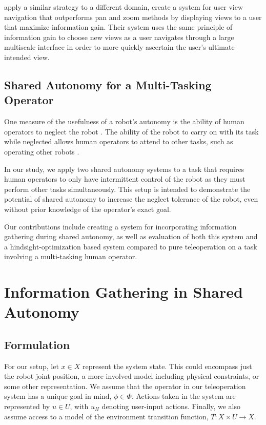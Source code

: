 \documentclass[conference]{IEEEtran}
\begin{document}
\citet{liu2017bignav} apply a similar strategy to a different domain, create a system for user view navigation that outperforms pan and zoom methods by displaying views to a user that maximize information gain. Their system uses the same principle of information gain to choose new views as a user navigates through a large multiscale interface in order to more quickly ascertain the user's ultimate intended view.

\subsection{Shared Autonomy for a Multi-Tasking Operator}
One measure of the usefulness of a robot's autonomy is the ability of human operators to neglect the robot \cite{crandall2002characterizing, olsen2003metrics}. The ability of the robot to carry on with its task while neglected allows human operators to attend to other tasks, such as operating other robots \cite{crandall2005validating, cummings2008predicting}.

In our study, we apply two shared autonomy systems to a task that requires human operators to only have intermittent control of the robot as they must perform other tasks simultaneously. This setup is intended to demonstrate the potential of shared autonomy to increase the neglect tolerance of the robot, even without prior knowledge of the operator's exact goal.

Our contributions include creating a system for incorporating information gathering during shared autonomy, as well as evaluation of both this system and a hindsight-optimization based system compared to pure teleoperation on a task involving a multi-tasking human operator.

\section{Information Gathering in Shared Autonomy}
\subsection{Formulation}

For our setup, let $ x \in X $ represent the system state. This could encompass just the robot joint position, a more involved model including physical constraints, or some other representation. We assume that the operator in our teleoperation system has a unique goal in mind, $\phi \in \Phi$. Actions taken in the system are represented by $ u \in U $, with $u_H$ denoting user-input actions. Finally, we also assume access to a model of the environment transition function, $T: X \times U \rightarrow X$.
\end{document}
